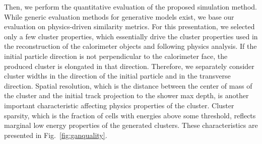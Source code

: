 \documentclass{PoS}
\begin{document}
Then, we perform the quantitative evaluation of the proposed
simulation method. While generic evaluation methods for generative
models exist, we base our evaluation on
physics-driven similarity metrics. For this presentation, we selected
only a few cluster properties, which essentially drive the cluster properties used in the reconstruction of the calorimeter objects and following physics
analysis. If the initial particle direction is not perpendicular to the
calorimeter face, the produced cluster is elongated in that direction. 
Therefore, we separately consider cluster widths in the direction of the
initial particle and in the transverse direction. 
Spatial resolution, which is the distance between the center of mass of the
cluster and the initial track projection to the shower max depth, is
another important characteristic affecting physics properties of the
cluster.
 Cluster sparsity, which is the fraction of cells with energies above some threshold, reflects marginal low energy properties of the generated clusters. 
These characteristics are presented in Fig.~\ref{fig:ganquality}.
\end{document}
